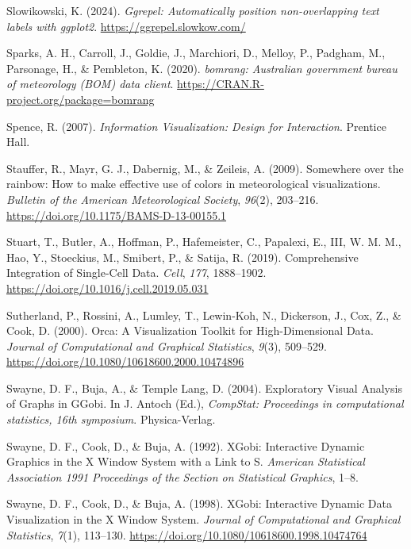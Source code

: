 \documentclass[
  letterpaper,
]{krantz}
\newlength{\cslhangindent}
\newenvironment{CSLReferences}[2] %
 {\begin{list}{}{%
  \setlength{\itemindent}{0pt}
  \setlength{\leftmargin}{0pt}
  \setlength{\parsep}{0pt}
  \ifodd #1
   \setlength{\leftmargin}{\cslhangindent}
   \setlength{\itemindent}{-1\cslhangindent}
  \fi
  \setlength{\itemsep}{#2\baselineskip}}}
 {\end{list}}
\begin{document}
\begin{CSLReferences}{1}{0}
Slowikowski, K. (2024). \emph{Ggrepel: Automatically position
non-overlapping text labels with ggplot2}.
\url{https://ggrepel.slowkow.com/}

Sparks, A. H., Carroll, J., Goldie, J., Marchiori, D., Melloy, P.,
Padgham, M., Parsonage, H., \& Pembleton, K. (2020). \emph{{bomrang}:
Australian government bureau of meteorology (BOM) data client}.
\url{https://CRAN.R-project.org/package=bomrang}

Spence, R. (2007). \emph{Information {V}isualization: {D}esign for
{I}nteraction}. Prentice Hall.

Stauffer, R., Mayr, G. J., Dabernig, M., \& Zeileis, A. (2009).
Somewhere over the rainbow: How to make effective use of colors in
meteorological visualizations. \emph{Bulletin of the American
Meteorological Society}, \emph{96}(2), 203--216.
\url{https://doi.org/10.1175/BAMS-D-13-00155.1}

Stuart, T., Butler, A., Hoffman, P., Hafemeister, C., Papalexi, E., III,
W. M. M., Hao, Y., Stoeckius, M., Smibert, P., \& Satija, R. (2019).
Comprehensive {I}ntegration of {S}ingle-{C}ell {D}ata. \emph{Cell},
\emph{177}, 1888--1902. \url{https://doi.org/10.1016/j.cell.2019.05.031}

Sutherland, P., Rossini, A., Lumley, T., Lewin-Koh, N., Dickerson, J.,
Cox, Z., \& Cook, D. (2000). Orca: A {V}isualization {T}oolkit for
{H}igh-{D}imensional {D}ata. \emph{Journal of Computational and
Graphical Statistics}, \emph{9}(3), 509--529.
\url{https://doi.org/10.1080/10618600.2000.10474896}

Swayne, D. F., Buja, A., \& Temple Lang, D. (2004). Exploratory {V}isual
{A}nalysis of {G}raphs in {GG}obi. In J. Antoch (Ed.), \emph{CompStat:
Proceedings in computational statistics, 16th symposium}.
Physica-Verlag.

Swayne, D. F., Cook, D., \& Buja, A. (1992). {XG}obi: {I}nteractive
{D}ynamic {G}raphics in the {X} {W}indow {S}ystem with a {L}ink to {S}.
\emph{American Statistical Association 1991 Proceedings of the Section
on Statistical Graphics}, 1--8.

Swayne, D. F., Cook, D., \& Buja, A. (1998). XGobi: {I}nteractive
{D}ynamic {D}ata {V}isualization in the {X} {W}indow {S}ystem.
\emph{Journal of Computational and Graphical Statistics}, \emph{7}(1),
113--130. \url{https://doi.org/10.1080/10618600.1998.10474764}


\end{CSLReferences}
\end{document}
